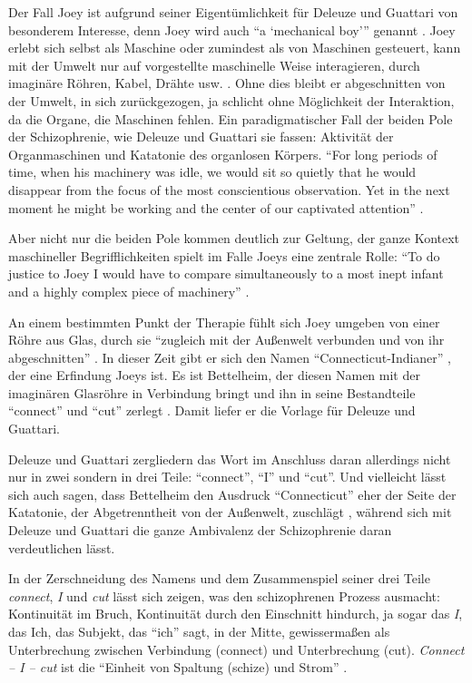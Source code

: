 \documentclass[12pt,
               DIV13,
               paper=a4,
               twoside=false,
               onehalfspacing,
               bibliography=totoc,
               toc=graduated,
               draft,
               ]{scrartcl}
\newcommand{\pc}[2]{\parencite[#1]{#2}}
\newcommand{\vgl}[2]{\parencite[vgl.][#1]{#2}}
\newcommand{\cic}{Connect -- I -- cut\xspace}
\newcommand{\dg}{Deleuze und Guattari\xspace}
\begin{document}
Der Fall Joey ist aufgrund seiner Eigentümlichkeit für \dg von
besonderem Interesse, denn Joey wird auch \enquote{a
\enquote{mechanical boy}} genannt \pc{3}{joey}. Joey erlebt sich
selbst als Maschine oder zumindest als von Maschinen gesteuert, kann
mit der Umwelt nur auf vorgestellte maschinelle Weise interagieren,
durch imaginäre Röhren, Kabel, Drähte usw. \vgl{3}{joey}. Ohne dies
bleibt er abgeschnitten von der Umwelt, in sich zurückgezogen, ja
schlicht ohne Möglichkeit der Interaktion, da die  Organe, die
Maschinen fehlen. Ein paradigmatischer Fall der beiden Pole der
Schizophrenie, wie \dg sie fassen: Aktivität der Organmaschinen und
Katatonie des organlosen Körpers. "`For long periods of time, when his
\glq machinery\grq{} was idle, we would sit so quietly that he would
disappear from the focus of the most conscientious observation. Yet in
the next moment he might be \glq working\grq{} and the center of our
captivated attention"' \pc{3}{joey}.

Aber nicht nur die beiden Pole kommen deutlich zur Geltung, der ganze
Kontext maschineller Begrifflichkeiten spielt im Falle Joeys eine
zentrale Rolle: "`To do justice to Joey I would have to compare
simultaneously to a most inept infant and a highly complex piece of
machinery"' \pc{3}{joey}.

An einem bestimmten Punkt der Therapie \vgl{398-404}{emptyf} fühlt
sich Joey umgeben von einer Röhre aus Glas, durch sie "`zugleich mit
der Außenwelt verbunden und von ihr abgeschnitten"' \pc{399}{emptyf}.
In dieser Zeit gibt er sich den Namen "`Connecticut-Indianer"'
\pc{399}{emptyf}, der eine Erfindung Joeys ist. Es ist Bettelheim, der
diesen Namen mit der imaginären Glasröhre in Verbindung bringt und ihn
in seine Bestandteile "`connect"' und "`cut"' zerlegt
\vgl{399}{emptyf}. Damit liefer er die Vorlage für \dg.

\dg zergliedern das Wort im Anschluss daran allerdings nicht nur in
zwei sondern in drei Teile: \enquote{connect}, \enquote{I} und
\enquote{cut}. Und vielleicht lässt sich auch sagen, dass Bettelheim
den Ausdruck "`Connecticut"' eher der Seite der Katatonie, der
Abgetrenntheit von der Außenwelt, zuschlägt \vgl{403}{emptyf}, während
sich mit \dg die ganze Ambivalenz der Schizophrenie daran
verdeutlichen lässt.

In der Zerschneidung des Namens und dem Zusammenspiel seiner drei
Teile \emph{connect}, \emph{I} und \emph{cut} lässt sich
zeigen, was den schizophrenen Prozess ausmacht: Kontinuität im
Bruch, Kontinuität durch den Einschnitt hindurch, ja sogar das
\emph{I}, das Ich, das Subjekt, das "`ich"' sagt, in der Mitte,
gewissermaßen als Unterbrechung zwischen Verbindung (connect) und
Unterbrechung (cut). \emph{\cic} ist die "`Einheit von Spaltung
(schize) und Strom"' \pc{296}{ao}.
\end{document}
